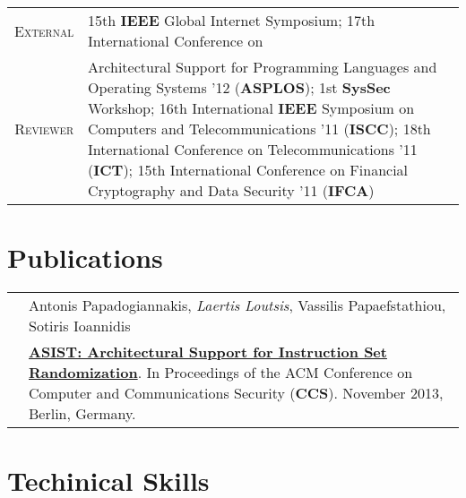 \documentclass[a4paper,10pt]{article} %
\begin{document}
\begin{tabular}{rp{12cm}}

\textsc{External} & 15th \textbf{IEEE} Global Internet Symposium; 17th International Conference on \\
\textsc{Reviewer} & Architectural Support for Programming Languages and Operating Systems '12 (\textbf{ASPLOS}); 1st \textbf{SysSec} Workshop; 16th International \textbf{IEEE} Symposium on Computers and Telecommunications '11 (\textbf{ISCC}); 18th International Conference on Telecommunications '11 (\textbf{ICT}); 15th International Conference on Financial Cryptography and Data Security '11 (\textbf{IFCA}) 

\end{tabular}


\section{Publications}

\begin{tabular}{rp{13cm}}

& Antonis Papadogiannakis, \emph{Laertis Loutsis}, Vassilis Papaefstathiou, Sotiris Ioannidis \\
& \href{https://dl.acm.org/citation.cfm?id=2508859.2516670}{\textbf{ASIST: Architectural Support for Instruction Set Randomization}}. In Proceedings of the ACM Conference on Computer and Communications Security (\textbf{CCS}). \small November 2013,  Berlin, Germany. \\

\end{tabular}


\section{Techinical Skills}
\end{document}
